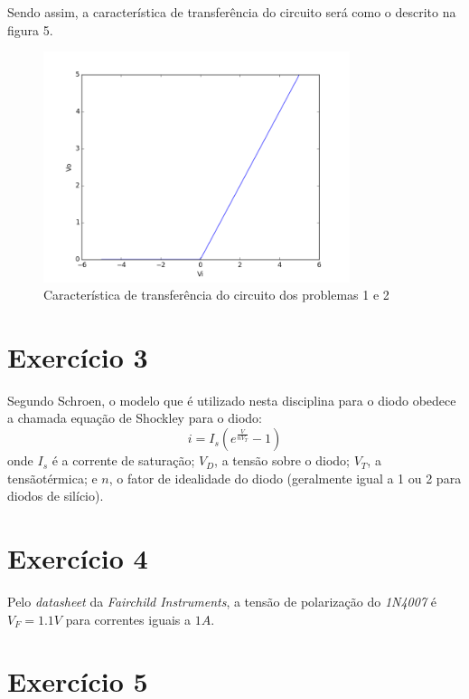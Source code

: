 \documentclass[12pt, a4paper, twoside]{article}
\begin{document}
Sendo assim, a característica de transferência do circuito será como o descrito na
figura 5.

\begin{figure}
    \centering
    \includegraphics[width=0.8\textwidth]{figs/rel3/ex2.png}
    \caption{Característica de transferência do circuito dos problemas 1 e 2}
\end{figure}

\section{Exercício 3}

Segundo Schroen, o modelo que é utilizado nesta disciplina para o diodo obedece a
chamada equação de Shockley para o diodo:
$$i = I_s\left( e^{\frac{V}{nV_T}} - 1 \right)$$
onde $I_s$ é a corrente de saturação;
$V_D$, a tensão sobre o diodo;
$V_T$, a tensãotérmica; e
$n$, o fator de idealidade do diodo (geralmente igual a 1 ou 2 para diodos
de silício).

\section{Exercício 4}

Pelo \textit{datasheet} da \textit{Fairchild Instruments}, a tensão de polarização
do \textit{1N4007} é $V_F = 1.1V$ para correntes iguais a $1A$.

\section{Exercício 5}
\end{document}
